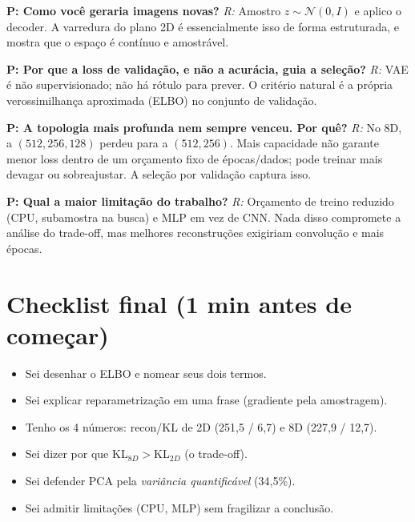 \documentclass[11pt,a4paper]{article}
\newcommand{\Q}[1]{\textbf{P: #1}}
\newcommand{\A}[1]{\textit{R:} #1}
\begin{document}
\begin{pergunta}
\Q{Como você geraria imagens novas?} \A{Amostro $z\sim\mathcal{N}(0,I)$ e aplico
o decoder. A varredura do plano 2D é essencialmente isso de forma estruturada, e
mostra que o espaço é contínuo e amostrável.}
\end{pergunta}

\begin{pergunta}
\Q{Por que a loss de validação, e não a acurácia, guia a seleção?} \A{VAE é não
supervisionado; não há rótulo para prever. O critério natural é a própria
verossimilhança aproximada (ELBO) no conjunto de validação.}
\end{pergunta}

\begin{pergunta}
\Q{A topologia mais profunda nem sempre venceu. Por quê?} \A{No 8D, a
$(512,256,128)$ perdeu para a $(512,256)$. Mais capacidade não garante menor loss
dentro de um orçamento fixo de épocas/dados; pode treinar mais devagar ou
sobreajustar. A seleção por validação captura isso.}
\end{pergunta}

\begin{pergunta}
\Q{Qual a maior limitação do trabalho?} \A{Orçamento de treino reduzido (CPU,
subamostra na busca) e MLP em vez de CNN. Nada disso compromete a análise do
trade-off, mas melhores reconstruções exigiriam convolução e mais épocas.}
\end{pergunta}

\section{Checklist final (1 min antes de começar)}

\begin{itemize}[leftmargin=1.2em, itemsep=0.05em]
\item Sei desenhar o ELBO e nomear seus dois termos.
\item Sei explicar reparametrização em uma frase (gradiente pela amostragem).
\item Tenho os 4 números: recon/KL de 2D (251,5 / 6,7) e 8D (227,9 / 12,7).
\item Sei dizer por que KL$_{8D}>$KL$_{2D}$ (o trade-off).
\item Sei defender PCA pela \emph{variância quantificável} (34,5\%).
\item Sei admitir limitações (CPU, MLP) sem fragilizar a conclusão.
\end{itemize}
\end{document}
